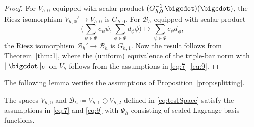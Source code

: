 \documentclass{amsart}
\begin{document}
\begin{proof} For $V_{h,0}$ equipped with scalar product $(G_{h,0}^{-1} \,\bigcdot)(\bigcdot)$, the Riesz isomorphism $V_{h,0}'\rightarrow V_{h,0}$ is $G_{h,0}$.
For $\mathcal{B}_h$ equipped with scalar product 
\begin{equation*}
\Big(\sum_{\psi \in \Psi} c_\psi \psi,\sum_{\phi \in \Psi} d_\phi \phi\Big) \mapsto 
\sum_{\psi \in \Psi} c_\psi d_\phi,
\end{equation*}
the Riesz isomorphism $\mathcal{B}_h'\rightarrow \mathcal{B}_h$ is $G_{h,1}$. Now the result follows from Theorem~\ref{thm:1}, where the (uniform) equivalence of the triple-bar norm with $\|\bigcdot\|_V$ on $V_h$ follows from the assumptions in \eqref{eq:7}--\eqref{eq:9}.
\end{proof}
%
The following lemma verifies the assumptions of Proposition~\ref{prop:splitting}.
\begin{lemma}
The spaces $V_{h,0}$ and $\mathcal{B}_h \coloneqq V_{h,1} \oplus V_{h,2}$ defined in \eqref{eq:testSpace} satisfy the assumptions in \eqref{eq:7} and \eqref{eq:9} with $\Psi_h$ consisting of scaled Lagrange basis functions.
\end{lemma}
\end{document}

